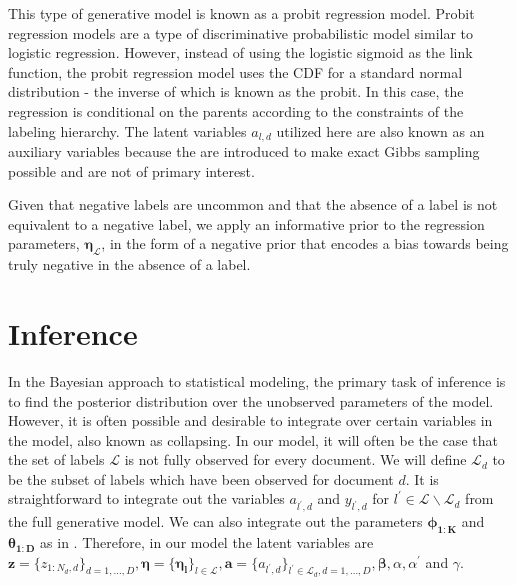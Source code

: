 \documentclass{article}
\begin{document}
This type of generative model is known as a probit regression model.
Probit regression models are a type of discriminative probabilistic
model similar to logistic regression. However, instead of using the
logistic sigmoid as the link function, the probit regression model
uses the CDF for a standard normal distribution - the inverse of which
is known as the probit. In this case, the regression is conditional
on the parents according to the constraints of the labeling hierarchy.
The latent variables $a_{l,d}$ utilized here are also known as an
auxiliary variables because the are introduced to make exact Gibbs
sampling possible and are not of primary interest.

Given that negative labels are uncommon and that the absence of a
label is not equivalent to a negative label, we apply an informative
prior to the regression parameters, $\mathbf{\eta}_{\mathcal{L}}$,
in the form of a negative prior that encodes a bias towards being
truly negative in the absence of a label.


\section{Inference}

\label{sec:inference} In the Bayesian approach to statistical modeling,
the primary task of inference is to find the posterior distribution
over the unobserved parameters of the model. However, it is often
possible and desirable to integrate over certain variables in the
model, also known as collapsing. In our model, it will often be the
case that the set of labels $\mathcal{L}$ is not fully observed for
every document. We will define $\mathcal{L}_{d}$ to be the subset
of labels which have been observed for document $d$. It is straightforward
to integrate out the variables $a_{l^{\prime},d}$ and $y_{l^{\prime},d}$
for $l^{\prime}\in\mathcal{L}\backslash\mathcal{L}_{d}$ from the
full generative model. We can also integrate out the parameters $\mathbf{\phi_{1:K}}$
and $\mathbf{\theta_{1:D}}$ as in \citet{Griffiths04}. Therefore,
in our model the latent variables are $\mathbf{z}=\{z_{1:N_{d},d}\}_{d=1,\ldots,D},\mathbf{\eta}=\{\mathbf{\eta_{l}}\}_{l\in\mathcal{L}},\mathbf{a}=\{a_{l^{\prime},d}\}_{l^{\prime}\in\mathcal{L}_{d},d=1,\ldots,D},\mathbf{\beta},\alpha,\alpha^{\prime}$
and $\gamma$.
\end{document}

